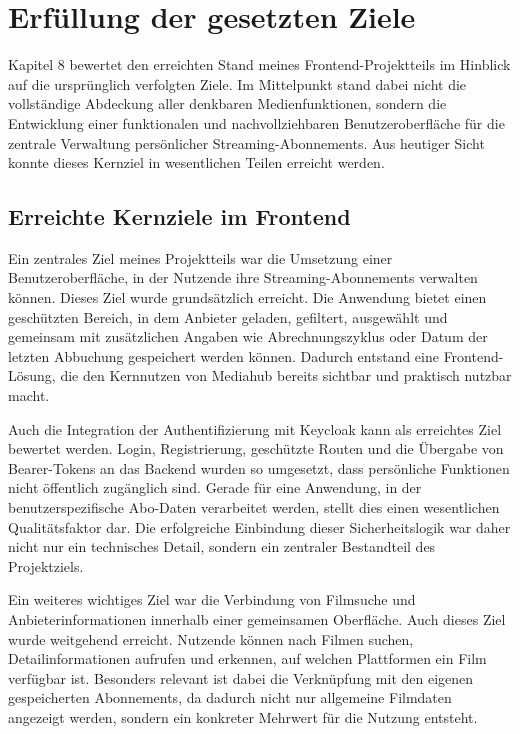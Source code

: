 \section{Erfüllung der gesetzten Ziele}
Kapitel 8 bewertet den erreichten Stand meines Frontend-Projektteils im Hinblick auf die ursprünglich verfolgten Ziele. Im Mittelpunkt stand dabei nicht die vollständige Abdeckung aller denkbaren Medienfunktionen, sondern die Entwicklung einer funktionalen und nachvollziehbaren Benutzeroberfläche für die zentrale Verwaltung persönlicher Streaming-Abonnements. Aus heutiger Sicht konnte dieses Kernziel in wesentlichen Teilen erreicht werden.

\subsection{Erreichte Kernziele im Frontend}
Ein zentrales Ziel meines Projektteils war die Umsetzung einer Benutzeroberfläche, in der Nutzende ihre Streaming-Abonnements verwalten können. Dieses Ziel wurde grundsätzlich erreicht. Die Anwendung bietet einen geschützten Bereich, in dem Anbieter geladen, gefiltert, ausgewählt und gemeinsam mit zusätzlichen Angaben wie Abrechnungszyklus oder Datum der letzten Abbuchung gespeichert werden können. Dadurch entstand eine Frontend-Lösung, die den Kernnutzen von Mediahub bereits sichtbar und praktisch nutzbar macht.

Auch die Integration der Authentifizierung mit Keycloak kann als erreichtes Ziel bewertet werden. Login, Registrierung, geschützte Routen und die Übergabe von Bearer-Tokens an das Backend wurden so umgesetzt, dass persönliche Funktionen nicht öffentlich zugänglich sind. Gerade für eine Anwendung, in der benutzerspezifische Abo-Daten verarbeitet werden, stellt dies einen wesentlichen Qualitätsfaktor dar. Die erfolgreiche Einbindung dieser Sicherheitslogik war daher nicht nur ein technisches Detail, sondern ein zentraler Bestandteil des Projektziels.

Ein weiteres wichtiges Ziel war die Verbindung von Filmsuche und Anbieterinformationen innerhalb einer gemeinsamen Oberfläche. Auch dieses Ziel wurde weitgehend erreicht. Nutzende können nach Filmen suchen, Detailinformationen aufrufen und erkennen, auf welchen Plattformen ein Film verfügbar ist. Besonders relevant ist dabei die Verknüpfung mit den eigenen gespeicherten Abonnements, da dadurch nicht nur allgemeine Filmdaten angezeigt werden, sondern ein konkreter Mehrwert für die Nutzung entsteht.

